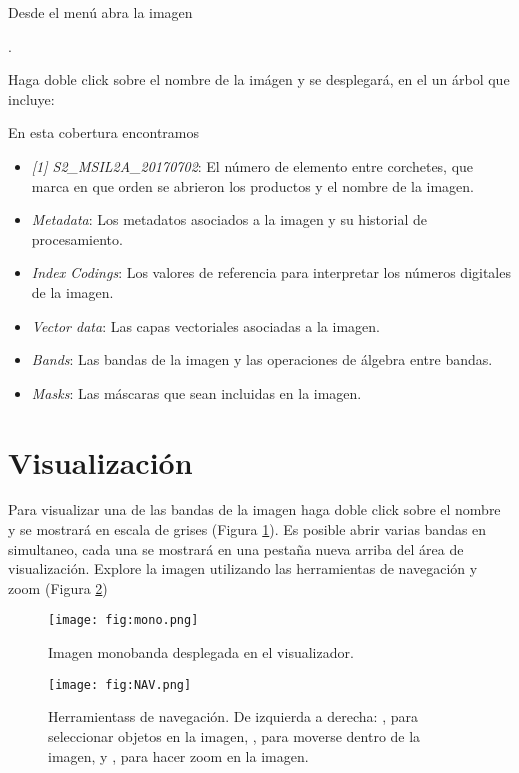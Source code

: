 Desde el menú  abra la imagen
\begin{center} .
\end{center}
Haga doble click sobre el nombre de la imágen y se desplegará, en el  un árbol que incluye:
\\

En esta cobertura encontramos

\begin{itemize}
    \item \emph{[1] S2\_MSIL2A\_20170702}: El número de elemento entre corchetes, que marca en que orden se abrieron los productos y el nombre de la imagen.
    \item \emph{Metadata}: Los metadatos asociados a la imagen y su historial de procesamiento.
    \item \emph{Index Codings}: Los valores de referencia para interpretar los números digitales de la imagen.
    \item \emph{Vector data}: Las capas vectoriales asociadas a la imagen.
    \item \emph{Bands}: Las bandas de la imagen y las operaciones de álgebra entre bandas.
    \item \emph{Masks}: Las máscaras que sean incluidas en la imagen.
\end{itemize}

\section{Visualización}

Para visualizar una de las bandas de la imagen haga doble click sobre el nombre y se mostrará en escala de grises (Figura \ref{fig:mono}). Es posible abrir varias bandas en simultaneo, cada una se mostrará en una pestaña nueva arriba del área de visualización. Explore la imagen utilizando las herramientas de navegación y zoom (Figura \ref{fig:NAV})

\begin{figure}[h!]
    \centering
    \texttt{[image: fig:mono.png]}
    \caption{Imagen monobanda desplegada en el visualizador.}
    \label{fig:mono}
\end{figure}



\begin{figure}[h!]
    \centering
    \texttt{[image: fig:NAV.png]}
    \caption{Herramientass de navegación. De izquierda a derecha: , para seleccionar objetos en la imagen, , para moverse dentro de la imagen, y , para hacer zoom en la imagen.}
    \label{fig:NAV}
\end{figure}

